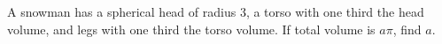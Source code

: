 A snowman has a spherical head of radius 3, a torso with one third the head volume, and legs with one third the torso volume. If total volume is $a\pi$, find $a$.
